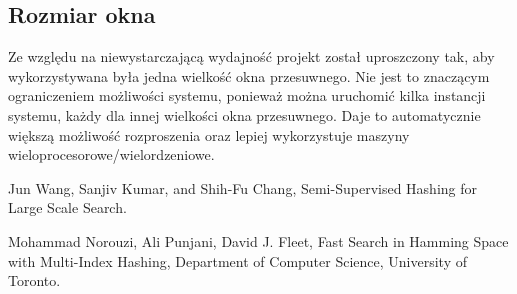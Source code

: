 \documentclass[10pt,a4paper]{article}
\begin{document}
\subsection{Rozmiar okna}
Ze względu na niewystarczającą wydajność projekt został uproszczony tak, aby wykorzystywana była jedna wielkość okna przesuwnego. Nie jest to znaczącym ograniczeniem możliwości systemu, ponieważ można uruchomić kilka instancji systemu, każdy dla innej wielkości okna przesuwnego. Daje to automatycznie większą możliwość rozproszenia oraz lepiej wykorzystuje maszyny wieloprocesorowe/wielordzeniowe.

\begin{thebibliography}{9}

  Jun Wang, Sanjiv Kumar, and Shih-Fu Chang,
  Semi-Supervised Hashing for Large Scale Search.
  
  Mohammad Norouzi, Ali Punjani, David J. Fleet,
  Fast Search in Hamming Space with Multi-Index Hashing,
  Department of Computer Science, University of Toronto.

\end{thebibliography}
\end{document}

